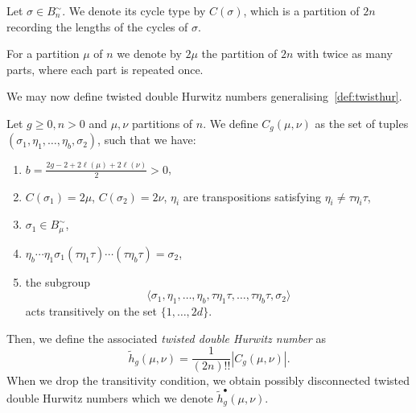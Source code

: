 \documentclass[ALCO,published]{cedram}
\begin{document}
\begin{defi}
Let $\sigma\in B^{\sim}_n$. We denote its cycle type by $C(\sigma)$, which is a partition of $2n$ recording the lengths of the cycles of $\sigma$.
\end{defi}

For a partition $\mu$ of $n$ we denote by $2\mu$ the partition of $2n$ with twice as many parts, where each part is repeated once.

We may now define twisted double Hurwitz numbers generalising~\cref{def:twisthur}.

\begin{defi}
\label{def:twisthurdou}
Let $g\ge0,n>0$ and $\mu,\nu$ partitions of $n$. We define $C_g(\mu,\nu)$ as the set of tuples $(\sigma_1,\eta_1,\dots,\eta_b,\sigma_2)$,
such that we have:
\begin{enumerate}
    \item $b=\frac{2g-2+2\ell(\mu)+2\ell(\nu)}{2}>0$,
    \item $C(\sigma_1)=2\mu$, $C(\sigma_2)=2\nu$, $\eta_i$ are transpositions satisfying $\eta_i\neq \tau \eta_i \tau$,
    \item $\sigma_1\in B^\sim_\mu$,
    \item $\eta_b\cdots\eta_1\sigma_1(\tau\eta_1\tau)\cdots(\tau\eta_b\tau)=\sigma_2$,
    \item the subgroup 
    $$\langle \sigma_1,\eta_1,\ldots,\eta_{b},\tau \eta_1\tau, \ldots,\tau\eta_b\tau,\sigma_2\rangle$$ acts transitively on the set $\{1,\ldots,2d\}$.
\end{enumerate}
Then, we define the associated \textit{twisted double Hurwitz number} as
\begin{equation*}
    \tilde{h}_{g}(\mu,\nu)=\frac{1}{(2n)!!}|C_g(\mu,\nu)|.
\end{equation*}
When we drop the transitivity condition, we obtain possibly disconnected twisted double Hurwitz numbers which we denote $\tilde{h}_{g}^\bullet(\mu,\nu)$.
\end{defi}
\end{document}
